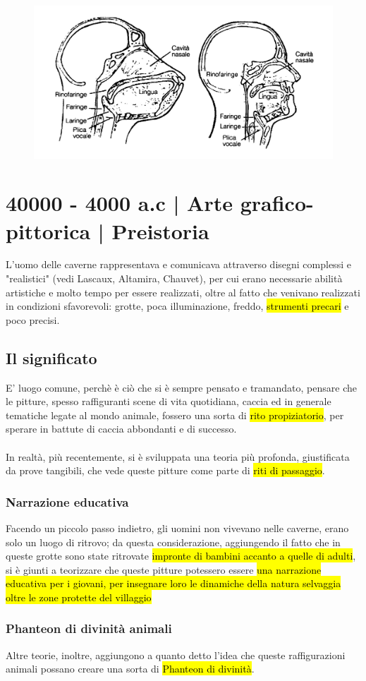 \begin{figure}[h]
    \centering
    \includegraphics[width=0.4\linewidth]{lezione_3/imgs/0016.jpg}
\end{figure}


\section{40000 - 4000 a.c | Arte grafico-pittorica | Preistoria}
L'uomo delle caverne rappresentava e comunicava attraverso disegni complessi e "realistici" (vedi Lascaux, Altamira, Chauvet), per cui erano necessarie abilità artistiche e molto tempo per essere realizzati, oltre al fatto che venivano realizzati in condizioni sfavorevoli: grotte, poca illuminazione, freddo, \hl{strumenti precari} e poco precisi.
    \subsection{Il significato}
    E' luogo comune, perchè è ciò che si è sempre pensato e tramandato, pensare che le pitture, spesso raffiguranti scene di vita quotidiana, caccia ed in generale tematiche legate al mondo animale, fossero una sorta di \hl{rito propiziatorio}, per sperare in battute di caccia abbondanti e di successo.
    \\\\In realtà, più recentemente, si è sviluppata una teoria più profonda, giustificata da prove tangibili, che vede queste pitture come parte di \hl{riti di passaggio}.
    \subsubsection{Narrazione educativa}
    Facendo un piccolo passo indietro, gli uomini non vivevano nelle caverne, erano solo un luogo di ritrovo; da questa considerazione, aggiungendo il fatto che in queste grotte sono state ritrovate \hl{impronte di bambini accanto a quelle di adulti}, si è giunti a teorizzare che queste pitture potessero essere \hl{una narrazione educativa per i giovani, per insegnare loro le dinamiche della natura selvaggia oltre le zone protette del villaggio }
    \subsubsection{Phanteon di divinità animali}
    Altre teorie, inoltre, aggiungono a quanto detto l'idea che queste raffigurazioni animali possano creare una sorta di \hl{Phanteon di divinità}.

